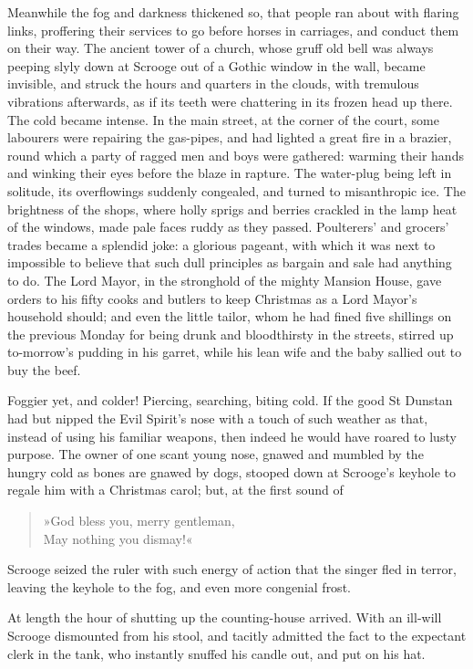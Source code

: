 Meanwhile the fog and darkness thickened so, that people ran about with flaring links, proffering their services to go before hors\-es in carriages, and conduct them on their way. The ancient tower of a church, whose gruff old bell was always peeping slyly down at Scrooge out of a Gothic window in the wall, became invisible, and struck the hours and quarters in the clouds, with tremulous vibrations afterwards, as if its teeth were chattering in its frozen head up there. The cold became intense. In the main street, at the corner of the court, some labourers were repairing the gas-pipes, and had lighted a great fire in a brazier, round which a party of ragged men and boys were gathered: warming their hands and winking their eyes before the blaze in rapture. The water-plug being left in solitude, its overflowings suddenly congealed, and turned to misanthropic ice. The brightness of the shops, where holly sprigs and berries crackled in the lamp heat of the windows, made pale faces ruddy as they passed. Poulterers' and grocers' trades became a splendid joke: a glorious pageant, with which it was next to impossible to believe that such dull principles as bargain and sale had anything to do. The Lord Mayor, in the stronghold of the mighty Mansion House, gave orders to his fifty cooks and butlers to keep Christmas as a Lord Mayor's household should; and even the little tailor, whom he had fined five shillings on the previous Monday for being drunk and bloodthirsty in the streets, stirred up to-morrow's pudding in his garret, while his lean wife and the baby sallied out to buy the beef.

Foggier yet, and colder! Piercing, searching, biting cold. If the good St Dunstan had but nipped the Evil Spirit's nose with a touch of such weather as that, instead of using his familiar weapons, then indeed he would have roared to lusty purpose. The owner of one scant young nose, gnawed and mumbled by the hungry cold as bones are gnawed by dogs, stooped down at Scrooge's keyhole to regale him with a Christmas carol; but, at the first sound of 

\blockquote{»God bless you, merry gentleman,\\
May nothing you dismay!«}

\noindent Scrooge seized the ruler with such energy of action that the singer fled in terror, leaving the keyhole to the fog, and even more congenial frost.

At length the hour of shutting up the counting-house arrived. With an ill-will Scrooge dismounted from his stool, and tacitly admitted the fact to the expectant clerk in the tank, who instantly snuffed his candle out, and put on his hat.

